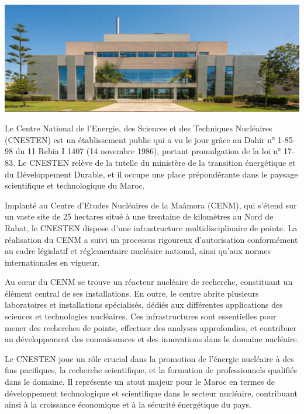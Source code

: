 \documentclass{report}
\newenvironment{mystyle}{
	\setlength{\parindent}{0pt} %
	\setlength{\parskip}{10pt} %
	\fontsize{12pt}{14pt}\selectfont %
}{
}
\begin{document}
	\begin{center} %
		\includegraphics[width=1\textwidth]{space.jpeg} 
	\end{center}
		\begin{mystyle}  	Le Centre National de l’Energie, des Sciences et des Techniques Nucléaires (CNESTEN) est un établissement public qui a vu le jour grâce au Dahir n° 1-85-98 du 11 Rebia I 1407 (14 novembre 1986), portant promulgation de la loi n° 17-83. Le CNESTEN relève de la tutelle du ministère de la transition énergétique et du Développement Durable, et il occupe une place prépondérante dans le paysage scientifique et technologique du Maroc.
		
		Implanté au Centre d’Etudes Nucléaires de la Maâmora (CENM), qui s'étend sur un vaste site de 25 hectares situé à une trentaine de kilomètres au Nord de Rabat, le CNESTEN dispose d'une infrastructure multidisciplinaire de pointe. La réalisation du CENM a suivi un processus rigoureux d'autorisation conformément au cadre législatif et réglementaire nucléaire national, ainsi qu'aux normes internationales en vigueur.
		
		Au cœur du CENM se trouve un réacteur nucléaire de recherche, constituant un élément central de ses installations. En outre, le centre abrite plusieurs laboratoires et installations spécialisés, dédiés aux différentes applications des sciences et technologies nucléaires. Ces infrastructures sont essentielles pour mener des recherches de pointe, effectuer des analyses approfondies, et contribuer au développement des connaissances et des innovations dans le domaine nucléaire.
		
		Le CNESTEN joue un rôle crucial dans la promotion de l'énergie nucléaire à des fins pacifiques, la recherche scientifique, et la formation de professionnels qualifiés dans le domaine. Il représente un atout majeur pour le Maroc en termes de développement technologique et scientifique dans le secteur nucléaire, contribuant ainsi à la croissance économique et à la sécurité énergétique du pays.
	\end{mystyle}
	
\end{document}
